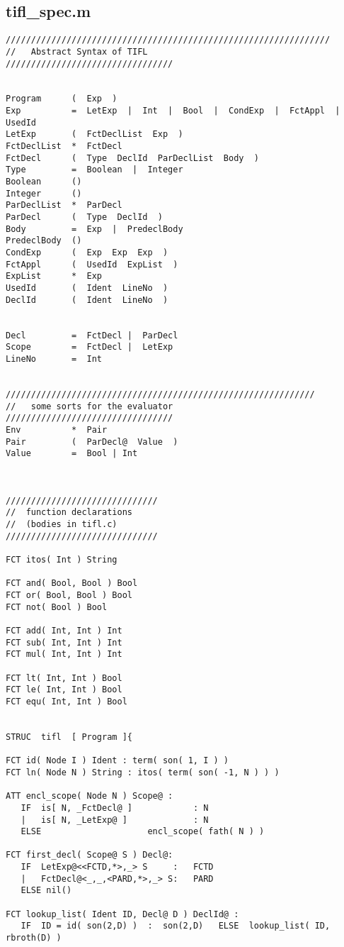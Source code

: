 \subsection{tifl\_spec.m}
\begin{verbatim}
////////////////////////////////////////////////////////////////
//   Abstract Syntax of TIFL 
/////////////////////////////////


Program      (  Exp  )
Exp          =  LetExp  |  Int  |  Bool  |  CondExp  |  FctAppl  |  UsedId
LetExp       (  FctDeclList  Exp  )
FctDeclList  *  FctDecl
FctDecl      (  Type  DeclId  ParDeclList  Body  )
Type         =  Boolean  |  Integer
Boolean      ()
Integer      ()
ParDeclList  *  ParDecl
ParDecl      (  Type  DeclId  )
Body         =  Exp  |  PredeclBody
PredeclBody  () 
CondExp      (  Exp  Exp  Exp  )
FctAppl      (  UsedId  ExpList  )
ExpList      *  Exp
UsedId       (  Ident  LineNo  )
DeclId       (  Ident  LineNo  )


Decl         =  FctDecl |  ParDecl
Scope        =  FctDecl |  LetExp
LineNo       =  Int


/////////////////////////////////////////////////////////////
//   some sorts for the evaluator
/////////////////////////////////
Env          *  Pair
Pair         (  ParDecl@  Value  )
Value        =  Bool | Int



//////////////////////////////
//  function declarations  
//  (bodies in tifl.c)
//////////////////////////////

FCT itos( Int ) String

FCT and( Bool, Bool ) Bool
FCT or( Bool, Bool ) Bool
FCT not( Bool ) Bool

FCT add( Int, Int ) Int
FCT sub( Int, Int ) Int
FCT mul( Int, Int ) Int

FCT lt( Int, Int ) Bool
FCT le( Int, Int ) Bool
FCT equ( Int, Int ) Bool


STRUC  tifl  [ Program ]{

FCT id( Node I ) Ident : term( son( 1, I ) )
FCT ln( Node N ) String : itos( term( son( -1, N ) ) )

ATT encl_scope( Node N ) Scope@ :
   IF  is[ N, _FctDecl@ ]            : N
   |   is[ N, _LetExp@ ]             : N 
   ELSE                     encl_scope( fath( N ) )

FCT first_decl( Scope@ S ) Decl@:
   IF  LetExp@<<FCTD,*>,_> S     :   FCTD
   |   FctDecl@<_,_,<PARD,*>,_> S:   PARD
   ELSE nil()

FCT lookup_list( Ident ID, Decl@ D ) DeclId@ :
   IF  ID = id( son(2,D) )  :  son(2,D)   ELSE  lookup_list( ID, rbroth(D) )


\end{verbatim}
